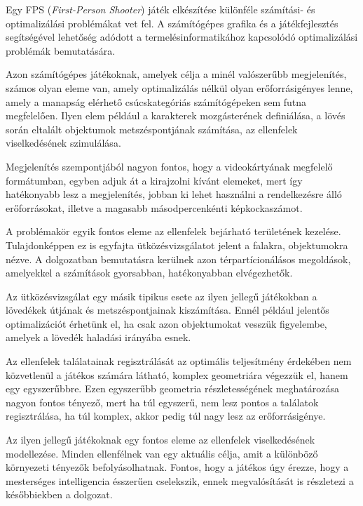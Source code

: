 \label{Chap:bevezetes}

Egy FPS (\textit{First-Person Shooter}) játék elkészítése különféle számítási- és optimalizálási problémákat vet fel. A számítógépes grafika és a játékfejlesztés segítségével lehetőség adódott a termelésinformatikához kapcsolódó optimalizálási problémák bemutatására.

Azon számítógépes játékoknak, amelyek célja a minél valószerűbb megjelenítés, számos olyan eleme van, amely optimalizálás nélkül olyan erőforrásigényes lenne, amely a manapság elérhető csúcskategóriás számítógépeken sem futna megfelelően. Ilyen elem például a karakterek mozgásterének definiálása, a lövés során eltalált objektumok metszéspontjának számítása, az ellenfelek viselkedésének szimulálása.

Megjelenítés szempontjából nagyon fontos, hogy a videokártyának megfelelő formátumban, egyben adjuk át a kirajzolni kívánt elemeket, mert így hatékonyabb lesz a megjelenítés, jobban ki lehet használni a rendelkezésre álló erőforrásokat, illetve a magasabb másodpercenkénti képkockaszámot.

A problémakör egyik fontos eleme az ellenfelek bejárható területének kezelése. Tulajdonképpen ez is egyfajta ütközésvizsgálatot jelent a falakra, objektumokra nézve. A dolgozatban bemutatásra kerülnek azon térpartícionálásos megoldások, amelyekkel a számítások gyorsabban, hatékonyabban elvégezhetők.

Az ütközésvizsgálat egy másik tipikus esete az ilyen jellegű játékokban a lövedékek útjának és metszéspontjainak kiszámítása. Ennél például jelentős optimalizációt érhetünk el, ha csak azon objektumokat vesszük figyelembe, amelyek a lövedék haladási irányába esnek.


Az ellenfelek találatainak regisztrálását az optimális teljesítmény érdekében nem közvetlenül a játékos számára látható, komplex geometriára végezzük el, hanem egy egyszerűbbre. Ezen egyszerűbb geometria részletességének meghatározása nagyon fontos tényező, mert ha túl egyszerű, nem lesz pontos a találatok regisztrálása, ha túl komplex, akkor pedig túl nagy lesz az erőforrásigénye.

Az ilyen jellegű játékoknak egy fontos eleme az ellenfelek viselkedésének modellezése. Minden ellenfélnek van egy aktuális célja, amit a különböző környezeti tényezők befolyásolhatnak. Fontos, hogy a játékos úgy érezze, hogy a mesterséges intelligencia ésszerűen cselekszik, ennek megvalósítását is részletezi a későbbiekben a dolgozat.
